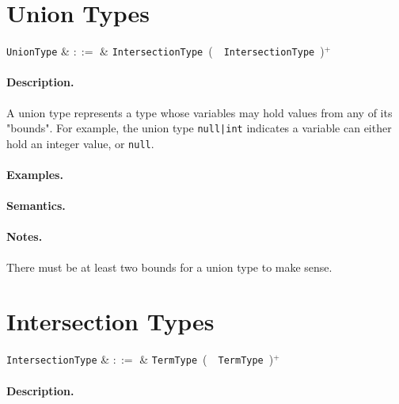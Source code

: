 \section{Union Types}

\begin{syntax}
  \verb+UnionType+ & $::=$ & \verb+IntersectionType+\ \big(\ \token{|}\ \verb+IntersectionType+\
  \big)$^+$\\
\end{syntax}

\paragraph{Description.}   A union type represents a type whose
variables may hold values from any of its "bounds". For example, the
union type \lstinline{null|int} indicates a variable can either hold
an integer value, or \lstinline{null}. 

\paragraph{Examples.}

\paragraph{Semantics.}

\paragraph{Notes.}  There must be at least two bounds for a union type to make sense.


\section{Intersection Types}

\begin{syntax}
  \verb+IntersectionType+ & $::=$ & \verb+TermType+\ \big(\ \token{\&}\ \verb+TermType+\
  \big)$^+$\\
\end{syntax}

\paragraph{Description.}

